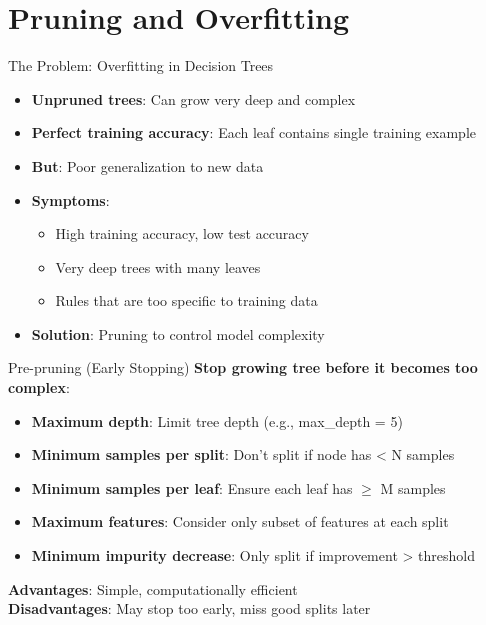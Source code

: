 \documentclass[usenames,dvipsnames]{beamer}
\begin{document}
\section{Pruning and Overfitting}

\begin{frame}{The Problem: Overfitting in Decision Trees}
\begin{itemize}[<+->]
\item \textbf{Unpruned trees}: Can grow very deep and complex
\item \textbf{Perfect training accuracy}: Each leaf contains single training example
\item \textbf{But}: Poor generalization to new data
\item \textbf{Symptoms}:
    \begin{itemize}
    \item High training accuracy, low test accuracy
    \item Very deep trees with many leaves
    \item Rules that are too specific to training data
    \end{itemize}
\item \textbf{Solution}: Pruning to control model complexity
\end{itemize}
\end{frame}

\begin{frame}{Pre-pruning (Early Stopping)}
\textbf{Stop growing tree before it becomes too complex}:
\begin{itemize}[<+->]
\item \textbf{Maximum depth}: Limit tree depth (e.g., max\_depth = 5)
\item \textbf{Minimum samples per split}: Don't split if node has < N samples
\item \textbf{Minimum samples per leaf}: Ensure each leaf has $\geq$ M samples
\item \textbf{Maximum features}: Consider only subset of features at each split
\item \textbf{Minimum impurity decrease}: Only split if improvement > threshold
\end{itemize}

\textbf{Advantages}: Simple, computationally efficient \\
\textbf{Disadvantages}: May stop too early, miss good splits later
\end{frame}
\end{document}
